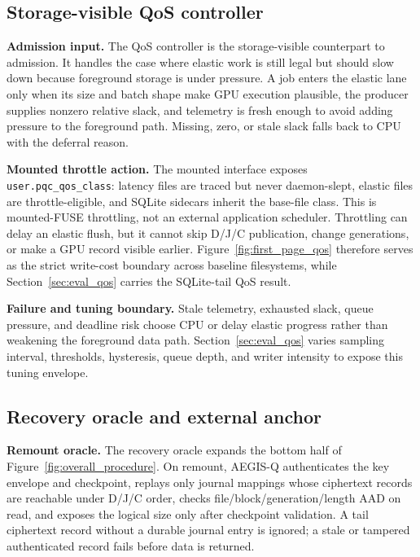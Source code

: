 \subsection{Storage-visible QoS controller}
\label{sec:design_qos}

\noindent\textbf{Admission input.}
The QoS controller is the storage-visible counterpart to admission.  It handles the case where elastic work is still legal but should slow down because foreground storage is under pressure.  A job enters the elastic lane only when its size and batch shape make GPU execution plausible, the producer supplies nonzero relative slack, and telemetry is fresh enough to avoid adding pressure to the foreground path.  Missing, zero, or stale slack falls back to CPU with the deferral reason.

\noindent\textbf{Mounted throttle action.}
The mounted interface exposes \texttt{user.pqc\_qos\_class}: latency files are traced but never daemon-slept, elastic files are throttle-eligible, and SQLite sidecars inherit the base-file class.  This is mounted-FUSE throttling, not an external application scheduler.  Throttling can delay an elastic flush, but it cannot skip D/J/C publication, change generations, or make a GPU record visible earlier.  Figure~\ref{fig:first_page_qos} therefore serves as the strict write-cost boundary across baseline filesystems, while Section~\ref{sec:eval_qos} carries the SQLite-tail QoS result.

\noindent\textbf{Failure and tuning boundary.}
Stale telemetry, exhausted slack, queue pressure, and deadline risk choose CPU or delay elastic progress rather than weakening the foreground data path.  Section~\ref{sec:eval_qos} varies sampling interval, thresholds, hysteresis, queue depth, and writer intensity to expose this tuning envelope.

\subsection{Recovery oracle and external anchor}
\label{sec:design_security}

\noindent\textbf{Remount oracle.}
The recovery oracle expands the bottom half of Figure~\ref{fig:overall_procedure}.  On remount, AEGIS-Q authenticates the key envelope and checkpoint, replays only journal mappings whose ciphertext records are reachable under D/J/C order, checks file/block/generation/length AAD on read, and exposes the logical size only after checkpoint validation.  A tail ciphertext record without a durable journal entry is ignored; a stale or tampered authenticated record fails before data is returned.

